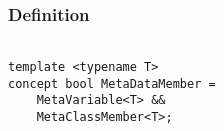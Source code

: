 
\subsubsection{Definition}

\begin{verbatim}

template <typename T>
concept bool MetaDataMember =
	MetaVariable<T> &&
	MetaClassMember<T>;

\end{verbatim}
